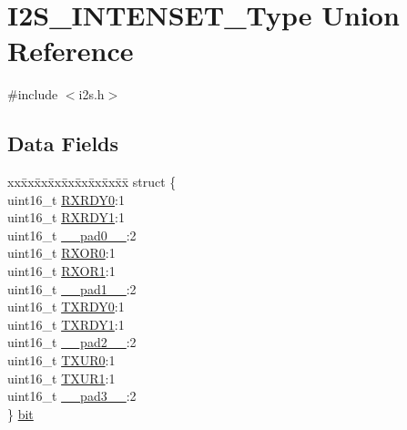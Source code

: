 \hypertarget{union_i2_s___i_n_t_e_n_s_e_t___type}{}\section{I2\+S\+\_\+\+I\+N\+T\+E\+N\+S\+E\+T\+\_\+\+Type Union Reference}
\label{union_i2_s___i_n_t_e_n_s_e_t___type}


{\ttfamily \#include $<$i2s.\+h$>$}

\subsection*{Data Fields}
\begin{DoxyCompactItemize}
\item 
\begin{tabbing}
xx\=xx\=xx\=xx\=xx\=xx\=xx\=xx\=xx\=\kill
struct \{\\
\>uint16\_t \mbox{\hyperlink{union_i2_s___i_n_t_e_n_s_e_t___type_a5807dcf889cc62a982386261d5a43f91}{RXRDY0}}:1\\
\>uint16\_t \mbox{\hyperlink{union_i2_s___i_n_t_e_n_s_e_t___type_a4a00cf88e57ed9e62fadfb21e6f688eb}{RXRDY1}}:1\\
\>uint16\_t \mbox{\hyperlink{union_i2_s___i_n_t_e_n_s_e_t___type_a77132c2c26a75f5b8751b235cda23828}{\_\_pad0\_\_}}:2\\
\>uint16\_t \mbox{\hyperlink{union_i2_s___i_n_t_e_n_s_e_t___type_abed2656e20bf2d1c2fba02932118afeb}{RXOR0}}:1\\
\>uint16\_t \mbox{\hyperlink{union_i2_s___i_n_t_e_n_s_e_t___type_aca907c0af3ebd3e69743961434b7b82d}{RXOR1}}:1\\
\>uint16\_t \mbox{\hyperlink{union_i2_s___i_n_t_e_n_s_e_t___type_ab72e3a1f2f7db8695c60c658f5a0f11a}{\_\_pad1\_\_}}:2\\
\>uint16\_t \mbox{\hyperlink{union_i2_s___i_n_t_e_n_s_e_t___type_a8eb494bdde9c6c1e3c38cb0d8afc13c2}{TXRDY0}}:1\\
\>uint16\_t \mbox{\hyperlink{union_i2_s___i_n_t_e_n_s_e_t___type_a7b2f75289a88e9c3ae8bc11c67680680}{TXRDY1}}:1\\
\>uint16\_t \mbox{\hyperlink{union_i2_s___i_n_t_e_n_s_e_t___type_a82701c5ec65a0fca9a84d8edc46a8192}{\_\_pad2\_\_}}:2\\
\>uint16\_t \mbox{\hyperlink{union_i2_s___i_n_t_e_n_s_e_t___type_a8e7545242f7eece2adcdc5c6f1f24822}{TXUR0}}:1\\
\>uint16\_t \mbox{\hyperlink{union_i2_s___i_n_t_e_n_s_e_t___type_ab45ae64a8c730600a185df6513d0b469}{TXUR1}}:1\\
\>uint16\_t \mbox{\hyperlink{union_i2_s___i_n_t_e_n_s_e_t___type_a1b0a1a9de051f3174325808d959500f7}{\_\_pad3\_\_}}:2\\
\} \mbox{\hyperlink{union_i2_s___i_n_t_e_n_s_e_t___type_a4d6e0ba86fd3494a9e5bd957213ab155}{bit}}\\


\end{tabbing}
\end{DoxyCompactItemize}
